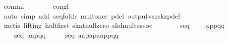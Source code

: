 \begin{isabellebody}
\ {}comml{}\ {}\ {}{}\isanewline
\ \ \ \ \isamarkupfalse%
\ congl\isanewline
\ \ \ \ \isamarkupfalse%
\ {}auto\ simp\ add{}\ seq{}foldr\ mult{}oner\ p{}def\ output{}vars{}kzp{}def{}\isanewline
\ \ \ \ \isamarkupfalse%
\ {}metis\ {}lifting{}\ halt{}first\ skat{}null{}zero\ skd{}mult{}assoc{}\isanewline
\isanewline
\ \ \isamarkupfalse%
\ \isamarkupfalse%
\ {}{}{}{}\ {}\ seq\isanewline
\ \ \ \ {}x{}{}p{}{}{}p{}{}{}q{}{}{}{}q{}{}{}\isanewline
\ \ \ \ {}{}seq\ {}{}a{}{}a{}{}p{}{}{}q{}{}{}{}q{}{}{}{}\isanewline
\ \ \ \ {}\ seq\ {}a{}{}a{}{}p{}{}{}{}{}a{}{}p{}{}{}a{}{}{}a{}{}p{}{}{}p{}{}{}q{}{}{}{}q{}{}{}{}{}\isanewline

\end{isabellebody}
